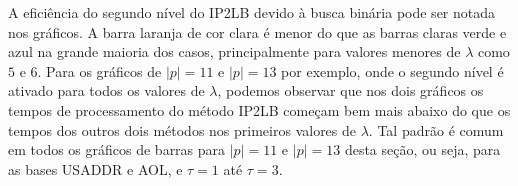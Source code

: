 A eficiência do segundo nível do IP2LB devido à busca binária pode ser notada nos gráficos. A barra laranja de cor clara é menor do que as barras claras verde e azul na grande maioria dos casos, principalmente para valores menores de $\lambda$ como $5$ e $6$. Para os gráficos de $|p|=11$ e $|p|=13$ por exemplo, onde o segundo nível é ativado para todos os valores de $\lambda$, podemos observar que nos dois gráficos os tempos de processamento do método IP2LB começam bem mais abaixo do que os tempos dos outros dois métodos nos primeiros valores de $\lambda$. Tal padrão é comum em todos os gráficos de barras para $|p|=11$ e $|p|=13$ desta seção, ou seja, para as bases USADDR e AOL, e $\tau=1$ até $\tau=3$.

\begin{table}[h]
\centering
{}
\end{table}
